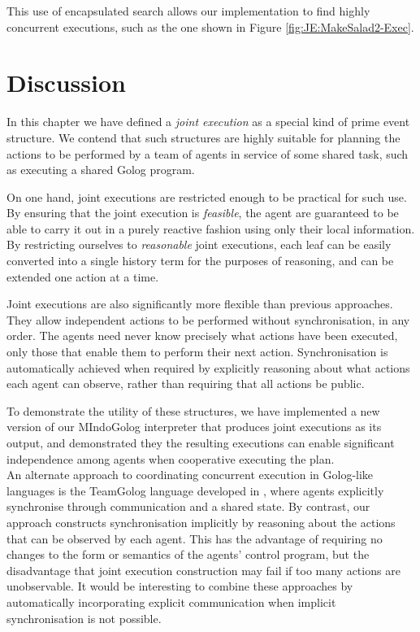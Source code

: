
This use of encapsulated search allows our implementation to find
highly concurrent executions, such as the one shown in Figure \ref{fig:JE:MakeSalad2-Exec}.


\section{Discussion\label{sec:JointExec:Discussion}}

In this chapter we have defined a \emph{joint execution} as a special
kind of prime event structure. We contend that such structures are
highly suitable for planning the actions to be performed by a team
of agents in service of some shared task, such as executing a shared
Golog program.

On one hand, joint executions are restricted enough to be practical
for such use. By ensuring that the joint execution is \emph{feasible},
the agent are guaranteed to be able to carry it out in a purely reactive
fashion using only their local information. By restricting ourselves
to \emph{reasonable }joint executions, each leaf can be easily converted
into a single history term for the purposes of reasoning, and can
be extended one action at a time.

Joint executions are also significantly more flexible than previous
approaches. They allow independent actions to be performed without
synchronisation, in any order. The agents need never know precisely
what actions have been executed, only those that enable them to perform
their next action. Synchronisation is automatically achieved when
required by explicitly reasoning about what actions each agent can
observe, rather than requiring that all actions be public.

To demonstrate the utility of these structures, we have implemented
a new version of our MIndoGolog interpreter that produces joint executions
as its output, and demonstrated they the resulting executions can
enable significant independence among agents when cooperative executing
the plan.\\


An alternate approach to coordinating concurrent execution in Golog-like
languages is the TeamGolog language developed in \citep{farinelli07team_golog},
where agents explicitly synchronise through communication and a shared
state. By contrast, our approach constructs synchronisation implicitly
by reasoning about the actions that can be observed by each agent.
This has the advantage of requiring no changes to the form or semantics
of the agents' control program, but the disadvantage that joint execution
construction may fail if too many actions are unobservable. It would
be interesting to combine these approaches by automatically incorporating
explicit communication when implicit synchronisation is not possible.


